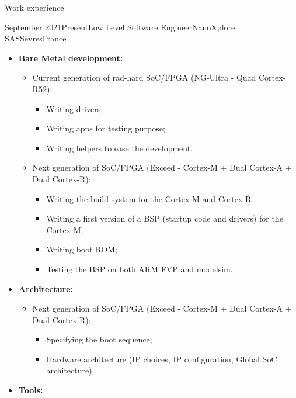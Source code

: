 \documentclass[a4paper, 10pt]{article}
\begin{document}
\begin{section} {Work experience}
    \begin{experience}{September 2021}{Present}{Low Level Software Engineer}{NanoXplore SAS}{S\`{e}vres}{France}
     \begin{subexperience}
		\begin{itemize}[parsep=0cm,itemsep=0cm,topsep=0cm]
			\item \textbf {Bare Metal development:}
				\begin{itemize}[parsep=0cm,itemsep=0cm,topsep=0cm]
					\item Current generation of rad-hard SoC/FPGA (NG-Ultra - Quad Cortex-R52):
					\begin{itemize}[parsep=0cm,itemsep=0cm,topsep=0cm]
						\item Writing drivers;
						\item Writing apps for testing purpose;
						\item Writing helpers to ease the development.
					\end{itemize}
					\item Next generation of SoC/FPGA (Exceed - Cortex-M + Dual Cortex-A + Dual Cortex-R):
					\begin{itemize}[parsep=0cm,itemsep=0cm,topsep=0cm]
						\item Writing the build-system for the Cortex-M and Cortex-R
						\item Writing a first version of a BSP (startup code and drivers) for the Cortex-M;
						\item Writing boot ROM;
						\item Testing the BSP on both ARM FVP and modelsim.
					\end{itemize}
				\end{itemize}
			\item \textbf {Architecture:}
				\begin{itemize}[parsep=0cm,itemsep=0cm,topsep=0cm]
					\item Next generation of SoC/FPGA (Exceed - Cortex-M + Dual Cortex-A + Dual Cortex-R):
					\begin{itemize}[parsep=0cm,itemsep=0cm,topsep=0cm]
						\item Specifying the boot sequence;
						\item Hardware architecture (IP choices, IP configuration, Global SoC architecture).
					\end{itemize}
				\end{itemize}
			\item \textbf {Tools:}

\end{itemize}
\end{subexperience}
\end{experience}
\end{section}
\end{document}

